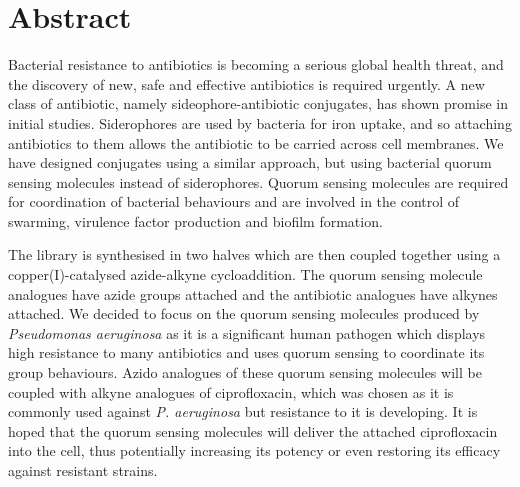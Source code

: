 \section{Abstract}

Bacterial resistance to antibiotics is becoming a serious global health threat, and the discovery of new, safe and effective antibiotics is required urgently\cite{ResistanceUS,davies2013drugs,ANIE:ANIE201209979}. A new class of antibiotic, namely sideophore-antibiotic conjugates, has shown promise in initial studies\cite{Page2013}. Siderophores are used by bacteria for iron uptake, and so attaching antibiotics to them allows the antibiotic to be carried across cell membranes. We have designed conjugates using a similar approach, but using bacterial quorum sensing molecules\cite{Waters2005} instead of siderophores. Quorum sensing molecules are required for coordination of bacterial behaviours and are involved in the control of swarming, virulence factor production and biofilm formation. 

The library is synthesised in two halves which are then coupled together using a copper(I)-catalysed azide-alkyne cycloaddition\cite{Tornoe2002,ANIE:ANIE2596}. The quorum sensing molecule analogues have azide groups attached and the antibiotic analogues have alkynes attached. We decided to focus on the quorum sensing molecules produced by \textit{Pseudomonas aeruginosa} as it is a significant human pathogen\cite{Bodey1983} which displays high resistance to many antibiotics\cite{Poole2004} and uses quorum sensing to coordinate its group behaviours\cite{Dubern2008}. Azido analogues of these quorum sensing molecules will be coupled with alkyne analogues of ciprofloxacin, which was chosen as it is commonly used against \textit{P. aeruginosa}\cite{Macgowan1999} but resistance to it is developing\cite{Su2010}. It is hoped that the quorum sensing molecules will deliver the attached ciprofloxacin into the cell, thus potentially increasing its potency or even restoring its efficacy against resistant strains.

\newpage